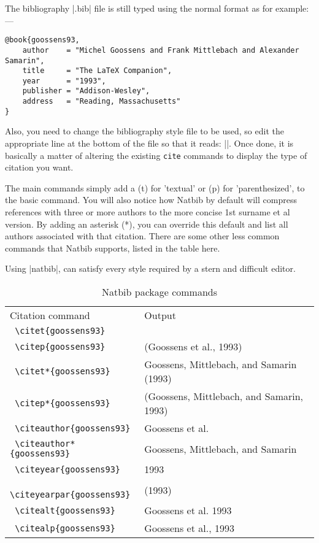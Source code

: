 The bibliography |.bib| file is still typed using the normal format as for example:---

\begin{lstlisting}[language={[common]TeX},% 
                           alsolanguage={[LaTeX]TeX},% 
                           alsolanguage={[primitive]TeX},%
                           alsolanguage={Verse}]
@book{goossens93,
    author    = "Michel Goossens and Frank Mittlebach and Alexander Samarin",
    title     = "The LaTeX Companion",
    year      = "1993",
    publisher = "Addison-Wesley",
    address   = "Reading, Massachusetts"
}
\end{lstlisting}



Also, you need to change the bibliography style file to be used, so edit the appropriate line at the bottom of the file so that it reads: ||. Once done, it is basically a matter of altering the existing \texttt{cite} commands to display the type of citation you want.


The main commands simply add a (t)  for 'textual' or (p) for 'parenthesized', to the basic  command. You will also notice how Natbib by default will compress references with three or more authors to the more concise 1st surname et al version. By adding an asterisk (*), you can override this default and list all authors associated with that citation. There are some other less common commands that Natbib supports, listed in the table here.

Using |natbib|, can satisfy every style required by a stern and difficult editor.

\begin{table}
\begin{tabular}{ll}
Citation command	&Output\\
\verb+ \citet{goossens93}+	&\citep{Liang1981}\\
\verb+ \citep{goossens93}+	&(Goossens et al., 1993)\\
\verb+ \citet*{goossens93}+	&Goossens, Mittlebach, and Samarin (1993)\\
\verb+ \citep*{goossens93}+	&(Goossens, Mittlebach, and Samarin, 1993)\\
\verb+ \citeauthor{goossens93}+	&Goossens et al.\\
\verb+ \citeauthor*{goossens93}+	&Goossens, Mittlebach, and Samarin\\
\verb+ \citeyear{goossens93}+	&1993\\
\verb+ \citeyearpar{goossens93}+	&(1993)\\
\verb+ \citealt{goossens93}+	&Goossens et al. 1993\\
\verb+ \citealp{goossens93}+	&Goossens et al., 1993\\
\end{tabular}
\caption{Natbib package commands}
\end{table}



